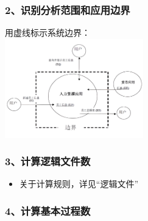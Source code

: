 
\hypertarget{ux8bc6ux522bux5206ux6790ux8303ux56f4ux548cux5e94ux7528ux8fb9ux754c}{%
\subsubsection{2、识别分析范围和应用边界}\label{ux8bc6ux522bux5206ux6790ux8303ux56f4ux548cux5e94ux7528ux8fb9ux754c}}

用虚线标示系统边界：\\

\includegraphics[width=6cm]{功能点计数P62-2.jpg}

\hypertarget{ux8ba1ux7b97ux903bux8f91ux6587ux4ef6ux6570}{%
\subsubsection{3、计算逻辑文件数}\label{ux8ba1ux7b97ux903bux8f91ux6587ux4ef6ux6570}}

\begin{itemize}
\tightlist
\item
  关于计算规则，详见``逻辑文件''
\end{itemize}

\hypertarget{ux8ba1ux7b97ux57faux672cux8fc7ux7a0bux6570}{%
\subsubsection{4、计算基本过程数}\label{ux8ba1ux7b97ux57faux672cux8fc7ux7a0bux6570}}

